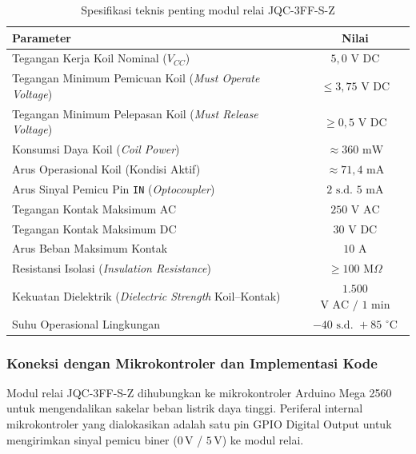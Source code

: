 \begin{table}[H]
	\centering
	\caption{Spesifikasi teknis penting modul relai JQC-3FF-S-Z}
	\label{tab:jqc3ff_spesifikasi}
	\small
	\begin{tabularx}{\textwidth}{@{} X c  @{}}
		\toprule
		Parameter                                                       & Nilai                                    \\
		\midrule
		Tegangan Kerja Koil Nominal ($V_{CC}$)                          & $5{,}0$  $\text{V DC}$                   \\
		Tegangan Minimum Pemicuan Koil (\textit{Must Operate Voltage})  & $\le 3{,}75$  $\text{V DC}$              \\
		Tegangan Minimum Pelepasan Koil (\textit{Must Release Voltage}) & $\ge 0{,}5$  $\text{V DC}$               \\
		Konsumsi Daya Koil (\textit{Coil Power})                        & $\approx 360$  $\text{mW}$               \\
		Arus Operasional Koil (Kondisi Aktif)                           & $\approx 71{,}4$  $\text{mA}$            \\
		Arus Sinyal Pemicu Pin \texttt{IN} (\textit{Optocoupler})       & $2\text{ s.d. }5$  $\text{mA}$               \\
		Tegangan Kontak Maksimum AC                                     & $250$  $\text{V AC}$                     \\
		Tegangan Kontak Maksimum DC                                     & $30$  $\text{V DC}$                      \\
		Arus Beban Maksimum Kontak                                      & $10$  $\text{A}$                         \\
		Resistansi Isolasi (\textit{Insulation Resistance})             & $\ge 100$  $\text{M}\Omega$              \\
		Kekuatan Dielektrik (\textit{Dielectric Strength} Koil--Kontak) & $1.500$  $\text{V AC / 1 min}$           \\
		Suhu Operasional Lingkungan                                     & $-40  \text{ s.d. } +85$  $^\circ\text{C}$ \\
		\bottomrule
	\end{tabularx}
\end{table}

\subsubsection{Koneksi dengan Mikrokontroler dan Implementasi Kode}
Modul relai JQC-3FF-S-Z dihubungkan ke mikrokontroler Arduino Mega 2560 untuk mengendalikan sakelar beban listrik daya tinggi. Periferal internal mikrokontroler yang dialokasikan adalah satu pin GPIO Digital Output untuk mengirimkan sinyal pemicu biner ($0\,\text{V}$ / $5\,\text{V}$) ke modul relai.


